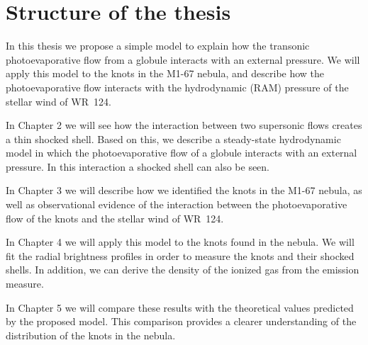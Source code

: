 \documentclass{book}
\begin{document}
\section{Structure of the thesis}

In this thesis we propose a simple model to explain how the transonic
photoevaporative flow from a globule interacts with an external
pressure. We will apply this model to the knots in the M1-67 nebula,
and describe how the photoevaporative flow interacts with the
hydrodynamic (RAM) pressure of the stellar wind of WR~124.

In Chapter 2 we will see how the interaction between two supersonic
flows creates a thin shocked shell. Based on this, we describe a
steady-state hydrodynamic model in which the photoevaporative flow of
a globule interacts with an external pressure. In this interaction a
shocked shell can also be seen.

In Chapter 3 we will describe how we identified the knots in the M1-67
nebula, as well as observational evidence of the interaction between
the photoevaporative flow of the knots and the stellar wind of WR~124.

In Chapter 4 we will apply this model to the knots found in the
nebula. We will fit the radial brightness profiles in order to measure
the knots and their shocked shells. In addition, we can derive the
density of the ionized gas from the emission measure.

In Chapter 5 we will compare these results with the theoretical values
predicted by the proposed model. This comparison provides a clearer
understanding of the distribution of the knots in the nebula.



\end{document}
